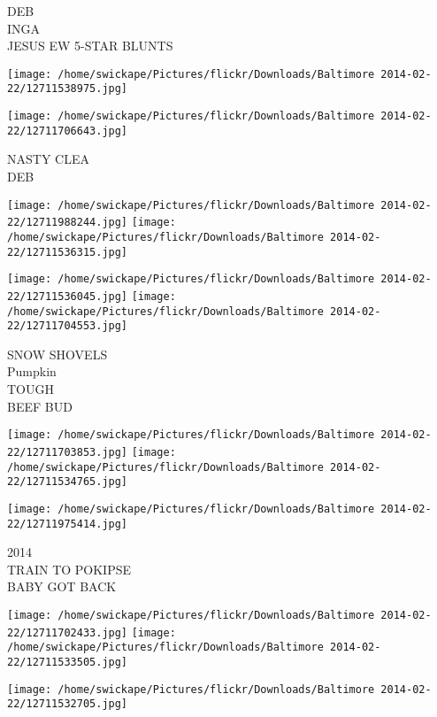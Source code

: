 \documentclass[10pt,letterpaper]{article}
\begin{document}
DEB\\
INGA\\
JESUS EW 5{-}STAR BLUNTS\\
\pagebreak

\texttt{[image: /home/swickape/Pictures/flickr/Downloads/Baltimore 2014-02-22/12711538975.jpg]}

\vspace{0.25in}
\texttt{[image: /home/swickape/Pictures/flickr/Downloads/Baltimore 2014-02-22/12711706643.jpg]}

NASTY CLEA\\
DEB\\
\pagebreak

\texttt{[image: /home/swickape/Pictures/flickr/Downloads/Baltimore 2014-02-22/12711988244.jpg]}
\texttt{[image: /home/swickape/Pictures/flickr/Downloads/Baltimore 2014-02-22/12711536315.jpg]}

\texttt{[image: /home/swickape/Pictures/flickr/Downloads/Baltimore 2014-02-22/12711536045.jpg]}
\texttt{[image: /home/swickape/Pictures/flickr/Downloads/Baltimore 2014-02-22/12711704553.jpg]}

SNOW SHOVELS\\
Pumpkin\\
TOUGH\\
BEEF BUD\\
\pagebreak

\texttt{[image: /home/swickape/Pictures/flickr/Downloads/Baltimore 2014-02-22/12711703853.jpg]}
\texttt{[image: /home/swickape/Pictures/flickr/Downloads/Baltimore 2014-02-22/12711534765.jpg]}

\vspace{0.25in}
\texttt{[image: /home/swickape/Pictures/flickr/Downloads/Baltimore 2014-02-22/12711975414.jpg]}

2014\\
TRAIN TO POKIPSE\\
BABY GOT BACK\\
\pagebreak

\texttt{[image: /home/swickape/Pictures/flickr/Downloads/Baltimore 2014-02-22/12711702433.jpg]}
\texttt{[image: /home/swickape/Pictures/flickr/Downloads/Baltimore 2014-02-22/12711533505.jpg]}

\vspace{0.25in}
\texttt{[image: /home/swickape/Pictures/flickr/Downloads/Baltimore 2014-02-22/12711532705.jpg]}
\end{document}
